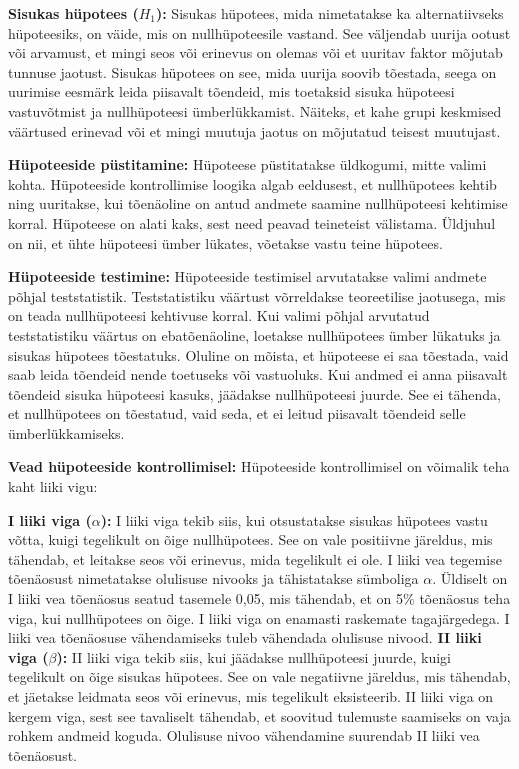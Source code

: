 \documentclass[
]{book}
\begin{document}
\textbf{Sisukas hüpotees (\(H_1\)):} Sisukas hüpotees, mida nimetatakse ka alternatiivseks hüpoteesiks, on väide, mis on nullhüpoteesile vastand. See väljendab uurija ootust või arvamust, et mingi seos või erinevus on olemas või et uuritav faktor mõjutab tunnuse jaotust. Sisukas hüpotees on see, mida uurija soovib tõestada, seega on uurimise eesmärk leida piisavalt tõendeid, mis toetaksid sisuka hüpoteesi vastuvõtmist ja nullhüpoteesi ümberlükkamist. Näiteks, et kahe grupi keskmised väärtused erinevad või et mingi muutuja jaotus on mõjutatud teisest muutujast.

\textbf{Hüpoteeside püstitamine:}
Hüpoteese püstitatakse üldkogumi, mitte valimi kohta. Hüpoteeside kontrollimise loogika algab eeldusest, et nullhüpotees kehtib ning uuritakse, kui tõenäoline on antud andmete saamine nullhüpoteesi kehtimise korral. Hüpoteese on alati kaks, sest need peavad teineteist välistama. Üldjuhul on nii, et ühte hüpoteesi ümber lükates, võetakse vastu teine hüpotees.

\textbf{Hüpoteeside testimine:}
Hüpoteeside testimisel arvutatakse valimi andmete põhjal teststatistik. Teststatistiku väärtust võrreldakse teoreetilise jaotusega, mis on teada nullhüpoteesi kehtivuse korral. Kui valimi põhjal arvutatud teststatistiku väärtus on ebatõenäoline, loetakse nullhüpotees ümber lükatuks ja sisukas hüpotees tõestatuks. Oluline on mõista, et hüpoteese ei saa tõestada, vaid saab leida tõendeid nende toetuseks või vastuoluks. Kui andmed ei anna piisavalt tõendeid sisuka hüpoteesi kasuks, jäädakse nullhüpoteesi juurde. See ei tähenda, et nullhüpotees on tõestatud, vaid seda, et ei leitud piisavalt tõendeid selle ümberlükkamiseks.

\textbf{Vead hüpoteeside kontrollimisel:}
Hüpoteeside kontrollimisel on võimalik teha kaht liiki vigu:

\textbf{I liiki viga (\(\alpha\)):} I liiki viga tekib siis, kui otsustatakse sisukas hüpotees vastu võtta, kuigi tegelikult on õige nullhüpotees. See on vale positiivne järeldus, mis tähendab, et leitakse seos või erinevus, mida tegelikult ei ole. I liiki vea tegemise tõenäosust nimetatakse olulisuse nivooks ja tähistatakse sümboliga \(\alpha\). Üldiselt on I liiki vea tõenäosus seatud tasemele 0,05, mis tähendab, et on 5\% tõenäosus teha viga, kui nullhüpotees on õige. I liiki viga on enamasti raskemate tagajärgedega. I liiki vea tõenäosuse vähendamiseks tuleb vähendada olulisuse nivood.
\textbf{II liiki viga (\(\beta\)):} II liiki viga tekib siis, kui jäädakse nullhüpoteesi juurde, kuigi tegelikult on õige sisukas hüpotees. See on vale negatiivne järeldus, mis tähendab, et jäetakse leidmata seos või erinevus, mis tegelikult eksisteerib. II liiki viga on kergem viga, sest see tavaliselt tähendab, et soovitud tulemuste saamiseks on vaja rohkem andmeid koguda. Olulisuse nivoo vähendamine suurendab II liiki vea tõenäosust.
\end{document}

